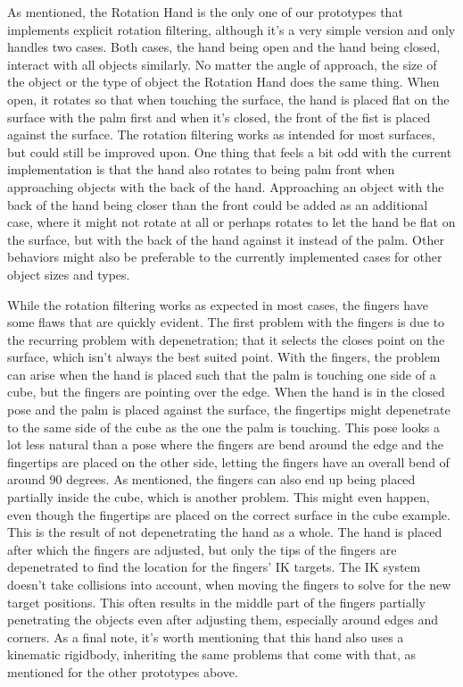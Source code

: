 As mentioned, the Rotation Hand is the only one of our prototypes that implements explicit rotation filtering, although it's a very simple version and only handles two cases. Both cases, the hand being open and the hand being closed, interact with all objects similarly. No matter the angle of approach, the size of the object or the type of object the Rotation Hand does the same thing. When open, it rotates so that when touching the surface, the hand is placed flat on the surface with the palm first and when it's closed, the front of the fist is placed against the surface. The rotation filtering works as intended for most surfaces, but could still be improved upon. One thing that feels a bit odd with the current implementation is that the hand also rotates to being palm front when approaching objects with the back of the hand. Approaching an object with the back of the hand being closer than the front could be added as an additional case, where it might not rotate at all or perhaps rotates to let the hand be flat on the surface, but with the back of the hand against it instead of the palm. Other behaviors might also be preferable to the currently implemented cases for other object sizes and types.

While the rotation filtering works as expected in most cases, the fingers have some flaws that are quickly evident. The first problem with the fingers is due to the recurring problem with depenetration; that it selects the closes point on the surface, which isn't always the best suited point. With the fingers, the problem can arise when the hand is placed such that the palm is touching one side of a cube, but the fingers are pointing over the edge. When the hand is in the closed pose and the palm is placed against the surface, the fingertips might depenetrate to the same side of the cube as the one the palm is touching. This pose looks a lot less natural than a pose where the fingers are bend around the edge and the fingertips are placed on the other side, letting the fingers have an overall bend of around 90 degrees. As mentioned, the fingers can also end up being placed partially inside the cube, which is another problem. This might even happen, even though the fingertips are placed on the correct surface in the cube example. This is the result of not depenetrating the hand as a whole. The hand is placed after which the fingers are adjusted, but only the tips of the fingers are depenetrated to find the location for the fingers' IK targets. The IK system doesn't take collisions into account, when moving the fingers to solve for the new target positions. This often results in the middle part of the fingers partially penetrating the objects even after adjusting them, especially around edges and corners. As a final note, it's worth mentioning that this hand also uses a kinematic rigidbody, inheriting the same problems that come with that, as mentioned for the other prototypes above.

